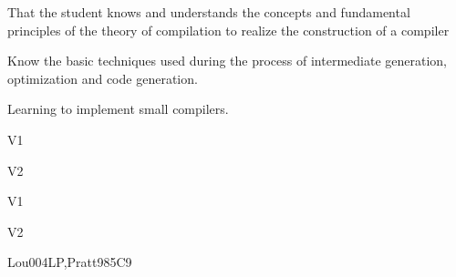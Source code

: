 \begin{syllabus}


\begin{justification}
That the student knows and understands the concepts and fundamental principles of the theory of compilation to realize the construction of a compiler
\end{justification}

\begin{goals}
\item Know the basic techniques used during the process of intermediate generation, optimization and code generation.
\item Learning to implement small compilers.
\end{goals}

\begin{outcomes}{V1}
    \item {}
    \item {}
    \item {}
\end{outcomes}

\begin{outcomes}{V2}
    \item {}
    \item {}
    \item {}
\end{outcomes}

\begin{competences}{V1}
    \item {} 
    \item {} 
\end{competences}

\begin{competences}{V2}
    \item {} 
    \item {} 
\end{competences}

\begin{unit}{\PLProgramRepresentation}{}{Lou004LP,Pratt98}{5}{C9}
\begin{topics}%
	\item \PLProgramRepresentationTopicPrograms
	\item \PLProgramRepresentationTopicAbstract
	\item \PLProgramRepresentationTopicData
	\item \PLRuntimeSystemsTopicJust
	\item \PLRuntimeSystemsTopicOther
\end{topics}


\end{unit}
\end{syllabus}
